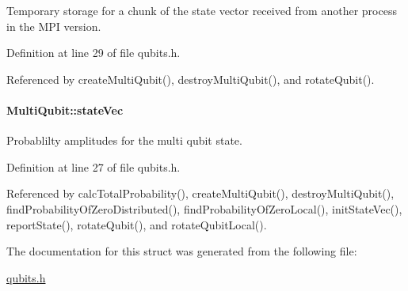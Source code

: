Temporary storage for a chunk of the state vector received from another process in the M\+PI version. 



Definition at line 29 of file qubits.\+h.



Referenced by create\+Multi\+Qubit(), destroy\+Multi\+Qubit(), and rotate\+Qubit().

\paragraph[{\texorpdfstring{state\+Vec}{stateVec}}]{ Multi\+Qubit\+::state\+Vec}\hypertarget{structMultiQubit_a45483190d6b01ef6b2f98f2bec9ab94f}{}\label{structMultiQubit_a45483190d6b01ef6b2f98f2bec9ab94f}


Probablilty amplitudes for the multi qubit state. 



Definition at line 27 of file qubits.\+h.



Referenced by calc\+Total\+Probability(), create\+Multi\+Qubit(), destroy\+Multi\+Qubit(), find\+Probability\+Of\+Zero\+Distributed(), find\+Probability\+Of\+Zero\+Local(), init\+State\+Vec(), report\+State(), rotate\+Qubit(), and rotate\+Qubit\+Local().



The documentation for this struct was generated from the following file\+:\begin{DoxyCompactItemize}
\item 
\hyperlink{qubits_8h}{qubits.\+h}\end{DoxyCompactItemize}
